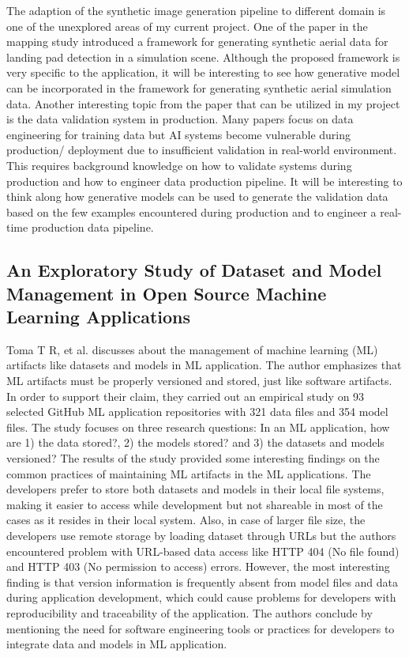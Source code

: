 \documentclass[a4paper, 11pt]{article}
\begin{document}
The adaption of the synthetic image generation pipeline to different domain is one of the unexplored areas of my current project. One of the paper in the mapping study introduced a framework for generating synthetic aerial data for landing pad detection in a simulation scene. Although the proposed framework is very specific to the application, it will be interesting to see how generative model can be incorporated in the framework for generating synthetic aerial simulation data. Another interesting topic from the paper that can be utilized in my project is the data validation system in production. Many papers focus on data engineering for training data but AI systems become vulnerable during production/ deployment due to insufficient validation in real-world environment. This requires background knowledge on how to validate systems during production and how to engineer data production pipeline. It will be interesting to think along how generative models can be used to generate the validation data based on the few examples encountered during production and to engineer a real-time production data pipeline.   

\subsection{An Exploratory Study of Dataset and Model Management in Open
Source Machine Learning Applications}
Toma T R, et al. \cite{toma2024exploratory} discusses about the management of machine learning (ML) artifacts like datasets and models in ML application. The author emphasizes that ML artifacts must be properly versioned and stored, just like software artifacts. In order to support their claim, they carried out an empirical study on 93 selected GitHub ML application repositories with 321 data files and 354 model files. The study focuses on three research questions:  In an ML application, how are 1) the data stored?, 2) the models stored? and 3) the datasets and models versioned? The results of the study provided some interesting findings on the common practices of maintaining ML artifacts in the ML applications. The developers prefer to store both datasets and models in their local file systems, making it easier to access while development but not shareable in most of the cases as it resides in their local system. Also, in case of larger file size, the developers use remote storage by loading dataset through URLs but the authors encountered problem with URL-based data access like HTTP 404 (No file found) and HTTP 403 (No permission to access) errors. However, the most interesting finding  is that version information is frequently absent from model files and data during application development, which could cause problems for developers with reproducibility and traceability of the application. The authors conclude by mentioning the need for software engineering tools or practices for developers to integrate data and models in ML application. 
\end{document}
